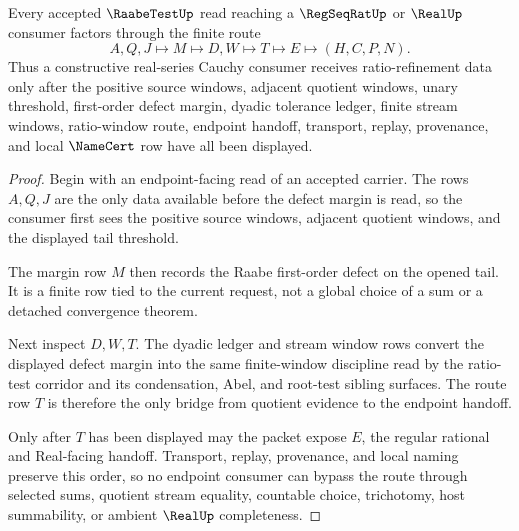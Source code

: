 \begin{theorem}
\label{thm:raabe-test-ratio-window-route}
Every accepted $\RaabeTestUp$ read reaching a $\RegSeqRatUp$ or $\RealUp$ consumer factors through the finite route
$$
A,Q,J \longmapsto M \longmapsto D,W \longmapsto T \longmapsto E \longmapsto (H,C,P,N).
$$
Thus a constructive real-series Cauchy consumer receives ratio-refinement data only after the positive source windows, adjacent quotient windows, unary threshold, first-order defect margin, dyadic tolerance ledger, finite stream windows, ratio-window route, endpoint handoff, transport, replay, provenance, and local $\NameCert$ row have all been displayed.
\end{theorem}
\begin{proof}
Begin with an endpoint-facing read of an accepted carrier. The rows $A,Q,J$ are the only data available before the defect margin is read, so the consumer first sees the positive source windows, adjacent quotient windows, and the displayed tail threshold.

The margin row $M$ then records the Raabe first-order defect on the opened tail. It is a finite row tied to the current request, not a global choice of a sum or a detached convergence theorem.

Next inspect $D,W,T$. The dyadic ledger and stream window rows convert the displayed defect margin into the same finite-window discipline read by the ratio-test corridor and its condensation, Abel, and root-test sibling surfaces. The route row $T$ is therefore the only bridge from quotient evidence to the endpoint handoff.

Only after $T$ has been displayed may the packet expose $E$, the regular rational and Real-facing handoff. Transport, replay, provenance, and local naming preserve this order, so no endpoint consumer can bypass the route through selected sums, quotient stream equality, countable choice, trichotomy, host summability, or ambient $\RealUp$ completeness.
\end{proof}



